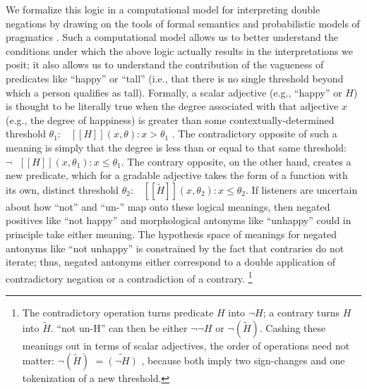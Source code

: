 \documentclass[floatsintext,doc]{apa6}
\let\rmarkdownfootnote\footnote%
\def\footnote{\protect\rmarkdownfootnote}
\begin{document}
We formalize this logic in a computational model for interpreting double negations by drawing on the tools of formal semantics and probabilistic models of pragmatics \cite{Franke2015a, Goodman2016:RSA}. 
Such a computational model allows us to better understand the conditions under which the above logic actually results in the interpretations we posit; it also allows us to understand the contribution of the vagueness of predicates like \enquote{happy} or \enquote{tall} (i.e., that there is no single threshold beyond which a person qualifies as tall). 
Formally, a scalar adjective (e.g., \enquote{happy} or $H$) is thought to be literally true when the degree associated with that adjective \(x\) (e.g., the degree of happiness) is greater than some contextually-determined threshold \(\theta_1\): \(\mbox{ $[\![H]\!]$}(x, \theta): x > \theta_1\) \cite{Kennedy2007}.
The contradictory opposite of such a meaning is simply that the degree is less than or equal to that same threshold: \(\neg \mbox{ $[\![H]\!]$}(x, \theta_1): x \leq \theta_1\).
The contrary opposite, on the other hand, creates a new predicate, which for a gradable adjective takes the form of a function with its own, distinct threshold \(\theta_2\): \(\mbox{ $[\![ \tilde{H} ]\!]$}(x, \theta_2): x \leq \theta_2\).
If listeners are uncertain about how \enquote{not} and \enquote{un-} map onto these logical meanings, then negated positives like \enquote{not happy} and morphological antonyms like \enquote{unhappy} could in principle take either meaning. 
The hypothesis space of meanings for negated antonyms like \enquote{not unhappy} is constrained by the fact that contraries do not iterate; thus, negated antonyms either correspond to a double application of contradictory negation or a contradiction of a contrary. \footnote{
	The contradictory operation turns predicate $H$ into $\neg H$; a contrary turns $H$ into $\tilde{H}$. ``not un-H'' can then be either \(\neg \neg H\) or \(\neg (\tilde{H})\). Cashing these meanings out in terms of scalar adjectives, the order of operations need not matter: \(\neg (\tilde{H})\) $= \tilde{(\neg H)}$ , because both imply two sign-changes and one tokenization of a new threshold.
}


\end{document}

